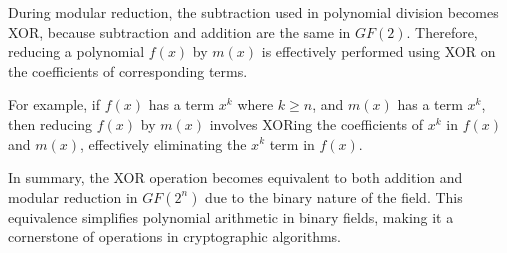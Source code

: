\begin{note}
\begin{itemize}
		During modular reduction, the subtraction used in polynomial division becomes XOR, because subtraction and addition are the same in \( GF(2) \). Therefore, reducing a polynomial \( f(x) \) by \( m(x) \) is effectively performed using XOR on the coefficients of corresponding terms.
		
		For example, if \( f(x) \) has a term \( x^k \) where \( k \geq n \), and \( m(x) \) has a term \( x^k \), then reducing \( f(x) \) by \( m(x) \) involves XORing the coefficients of \( x^k \) in \( f(x) \) and \( m(x) \), effectively eliminating the \( x^k \) term in \( f(x) \).
	\end{itemize}
	
	In summary, the XOR operation becomes equivalent to both addition and modular reduction in \( GF(2^n) \) due to the binary nature of the field. This equivalence simplifies polynomial arithmetic in binary fields, making it a cornerstone of operations in cryptographic algorithms.
\end{note}

